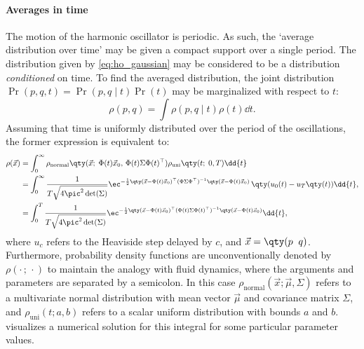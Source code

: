 \paragraph{Averages in time}
The motion of the harmonic oscillator is periodic. As such, the `average distribution over time' may be given a compact support over a single period. The distribution given by \cref{eq:ho_gaussian} may be considered to be a distribution \emph{conditioned} on time. To find the averaged distribution, the joint distribution $\Pr(p, q, t) = \Pr(p, q \mid t)\Pr(t)$ may be marginalized with respect to $t$:
$$ \rho(p, q) = \int \rho(p, q\mid t)\rho(t) \dd{t}. $$
Assuming that time is uniformly distributed over the period of the oscillations, the former expression is equivalent to:
\begin{equation}
    \begin{split}
        \rho(\vec{x}) &= \int_{0}^{\infty} \rho_\text{normal}\qty(\vec{x};\; \Phi(t)\vec{x}_0,\,\Phi(t)\Sigma\Phi(t)^\top)\rho_\text{uni}
        \qty(t;\; 0, T)\dd{t} \\
        &= \int_{0}^{\infty} \frac{1}{T\sqrt{4\pic^2\det(\Sigma)}}
        \ec^{-\frac{1}{2}\qty(\vec{x} - \Phi(t)\vec{x}_0)^\top(\Phi\Sigma\Phi^\top)^{-1}\qty(\vec{x} - \Phi(t)\vec{x}_0)}\, \qty(u_0(t) - u_T\qty(t)) \dd{t},\\
        &= \int_{0}^{T} \frac{1}{T\sqrt{4\pic^2\det(\Sigma)}}
        \ec^{-\frac{1}{2}\qty(\vec{x} - \Phi(t)\vec{x}_0)^\top(\Phi(t)\Sigma\Phi(t)^\top)^{-1}\qty(\vec{x} - \Phi(t)\vec{x}_0)} \dd{t},
    \end{split}
    \label{eq:time_averaged_pq}
\end{equation}
where $u_c$ refers to the Heaviside step delayed by $c$, and $\vec{x} = \qty(p\;\;q)$. Furthermore, probability density functions are unconventionally denoted by $\rho(\cdot\,;\,\cdot)$ to maintain the analogy with fluid dynamics, where the arguments and parameters are separated by a semicolon. In this case $\rho_\text{normal}(\vec{x}; \vec{\mu}, \Sigma)$ refers to a multivariate normal distribution with mean vector $\vec{\mu}$ and covariance matrix $\Sigma$, and $\rho_\text{uni}(t; a, b)$ refers to a scalar uniform distribution with bounds $a$ and $b$.  visualizes a numerical solution for this integral for some particular parameter values. 
